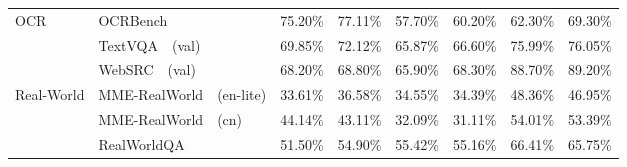 \begin{table}[t!]
{\begin{tabular}{p{1.5cm}p{3cm}p{1.5cm}p{1.6cm}p{1.5cm}p{1.6cm}p{1.5cm}p{1.6cm}}
    \multirow{3}{*}{\parbox{1.5cm}{OCR}} 
     & OCRBench~\cite{liu2024hidden} \newline \tiny{\color{light-gray}{Comprehensive OCR}} & 75.20\tiny{\%} & \cellcolor{front-color} 77.11\tiny{\%} \tiny{\color{brown}{+1.91\%}} & 57.70\tiny{\%} & \cellcolor{front-color} 60.20\tiny{\%} \tiny{\color{brown}{+2.50\%}} & 62.30\tiny{\%} & \cellcolor{front-color} 69.30\tiny{\%} \tiny{\color{brown}{+7.00\%}} \\
    & TextVQA~\cite{singh2019towards}~\tiny{(val)} \newline \tiny{\color{light-gray}{Text Reading}} & 69.85\tiny{\%} & \cellcolor{front-color} 72.12\tiny{\%} \tiny{\color{brown}{+2.27\%}} & 65.87\tiny{\%} & \cellcolor{front-color} 66.60\tiny{\%} \tiny{\color{brown}{+0.73\%}} & 75.99\tiny{\%} & \cellcolor{front-color} 76.05\tiny{\%} \tiny{\color{brown}{+0.06\%}} \\
    & WebSRC~\cite{chen2021websrc}~\tiny{(val)} \newline \tiny{\color{light-gray}{Web-based Structural Reading}} & 68.20\tiny{\%} & \cellcolor{front-color} 68.80\tiny{\%} \tiny{\color{brown}{+0.60\%}} & 65.90\tiny{\%} & \cellcolor{front-color} 68.30\tiny{\%} \tiny{\color{brown}{+2.40\%}} & 88.70\tiny{\%} & \cellcolor{front-color} 89.20\tiny{\%} \tiny{\color{brown}{+0.50\%}} \\
\cmidrule{2-8}
\multirow{3}{*}{\parbox{1.5cm}{Real-World}} 
    & MME-RealWorld~\cite{zhang2024mme}~\tiny{(en-lite)} \newline\tiny{\color{light-gray}{Multi-discip \& High-Resolution}} & 33.61\tiny{\%} & \cellcolor{front-color} 36.58\tiny{\%} \tiny{\color{brown}{+2.97\%}} & 34.55\tiny{\%} & \cellcolor{front-color} 34.39\tiny{\%} \tiny{\color{gray}{-0.16\%}} & 48.36\tiny{\%} & \cellcolor{front-color} 46.95\tiny{\%} \tiny{\color{gray}{-1.41\%}} \\
    & MME-RealWorld~\cite{zhang2024mme}~\tiny{(cn)} \newline \tiny{\color{light-gray}{Multi-discip \& High-Resolution}} & 44.14\tiny{\%} & \cellcolor{front-color} 43.11\tiny{\%} \tiny{\color{ gray}{-1.03\%}} & 32.09\tiny{\%} & \cellcolor{front-color} 31.11\tiny{\%} \tiny{\color{gray}{-0.98\%}} & 54.01\tiny{\%} & \cellcolor{front-color} 53.39\tiny{\%} \tiny{\color{brown}{-0.62\%}} \\
    & RealWorldQA \newline \tiny{\color{light-gray}{Realworld QA}} & 51.50\tiny{\%} & \cellcolor{front-color} 54.90\tiny{\%} \tiny{\color{brown}{+3.40\%}} & 55.42\tiny{\%} & \cellcolor{front-color} 55.16\tiny{\%} \tiny{\color{gray}{-0.26\%}} & 66.41\tiny{\%} & \cellcolor{front-color} 65.75\tiny{\%} \tiny{\color{gray}{-0.66\%}} \\

\end{tabular}}
\end{table}
